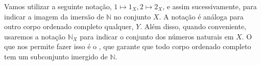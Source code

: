 \documentclass[../main.tex]{subfiles}
\begin{document}
Vamos utilizar a seguinte notação, $1 \mapsto 1_X, 2 \mapsto 2_X$, e assim sucessivamente, para indicar a imagem da imersão de $\mathbb{N}$ no conjunto $X$. A notação é análoga para outro corpo ordenado completo qualquer, $Y$. Além disso, quando conveniente, usaremos a notação $\mathbb{N}_X$ para indicar o conjunto dos números naturais em $X$. O que nos permite fazer isso é o , que garante que todo corpo ordenado completo tem um subconjunto imergido de $\mathbb{N}$. 

\end{document}
